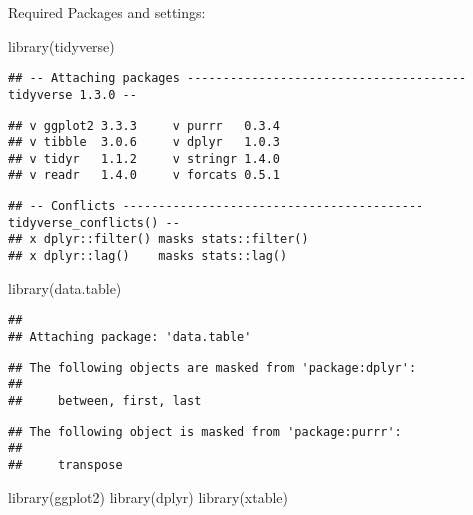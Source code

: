 \documentclass[
]{article}
\author{}
\date{\vspace{-2.5em}}
\newenvironment{Shaded}{\begin{snugshade}}{\end{snugshade}}
\newcommand{\FunctionTok}[1]{\textcolor[rgb]{0.00,0.00,0.00}{#1}}
\newcommand{\NormalTok}[1]{#1}
\begin{document}
Required Packages and settings:

\begin{Shaded}
\begin{Highlighting}[]
\FunctionTok{library}\NormalTok{(tidyverse)}
\end{Highlighting}
\end{Shaded}

\begin{verbatim}
## -- Attaching packages --------------------------------------- tidyverse 1.3.0 --
\end{verbatim}

\begin{verbatim}
## v ggplot2 3.3.3     v purrr   0.3.4
## v tibble  3.0.6     v dplyr   1.0.3
## v tidyr   1.1.2     v stringr 1.4.0
## v readr   1.4.0     v forcats 0.5.1
\end{verbatim}

\begin{verbatim}
## -- Conflicts ------------------------------------------ tidyverse_conflicts() --
## x dplyr::filter() masks stats::filter()
## x dplyr::lag()    masks stats::lag()
\end{verbatim}

\begin{Shaded}
\begin{Highlighting}[]
\FunctionTok{library}\NormalTok{(data.table)}
\end{Highlighting}
\end{Shaded}

\begin{verbatim}
## 
## Attaching package: 'data.table'
\end{verbatim}

\begin{verbatim}
## The following objects are masked from 'package:dplyr':
## 
##     between, first, last
\end{verbatim}

\begin{verbatim}
## The following object is masked from 'package:purrr':
## 
##     transpose
\end{verbatim}

\begin{Shaded}
\begin{Highlighting}[]
\FunctionTok{library}\NormalTok{(ggplot2)}
\FunctionTok{library}\NormalTok{(dplyr)}
\FunctionTok{library}\NormalTok{(xtable)}
\end{Highlighting}
\end{Shaded}
\end{document}
